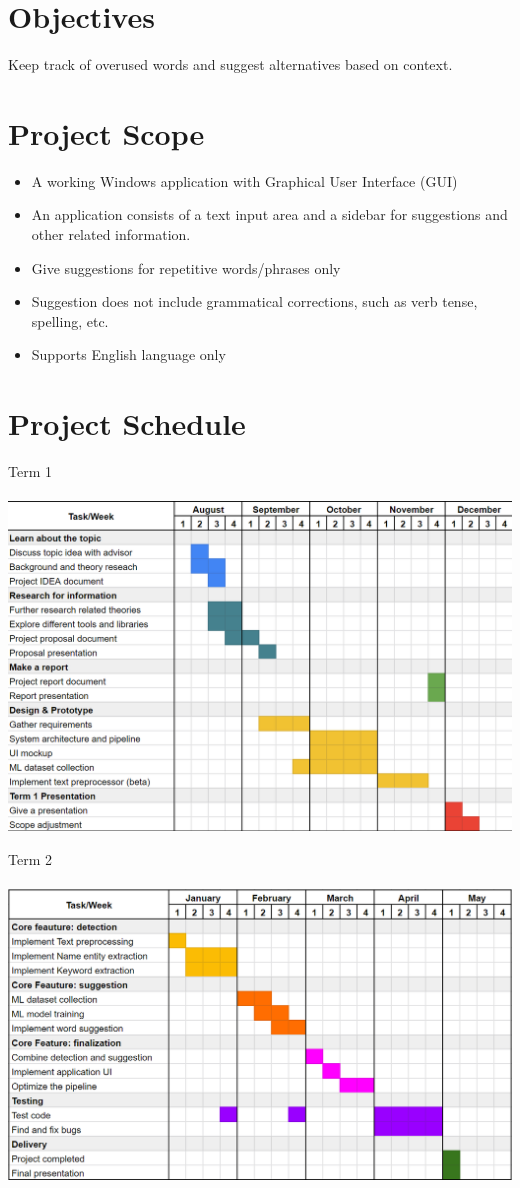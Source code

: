 \documentclass[12pt,oneside,openright,a4paper]{cpe-english-project}
\begin{document}
\section{Objectives}
Keep track of overused words and suggest alternatives based on context.

\section{Project Scope}
\begin{itemize}
\item A working Windows application with Graphical User Interface (GUI)
\item An application consists of a text input area and a sidebar for suggestions and other related information.
\item Give suggestions for repetitive words/phrases only
\item Suggestion does not include grammatical corrections, such as verb tense, spelling, etc.
\item Supports English language only
\end{itemize}

\section{Project Schedule}
Term 1\\ \\
\includegraphics[width=15cm]{./img/chp1/schedule1.png}

Term 2\\ \\
\includegraphics[width=15cm]{./img/chp1/schedule2.png}
\end{document}
